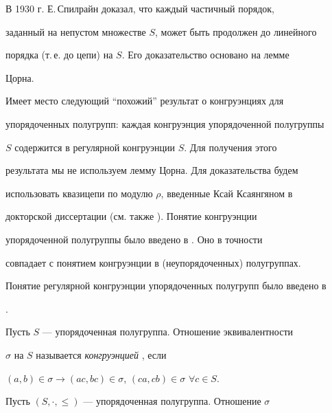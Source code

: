  




\maketitle 


\label{begin} 


 


В 1930 г. Е.\,Спилрайн \cite{1} доказал, что каждый частичный порядок, 


заданный на непустом множестве $S$, может быть продолжен до линейного 


порядка (т.\,е. до цепи) на $S$. Его доказательство основано на лемме 


Цорна. 


 


Имеет место следующий ``похожий'' результат о конгруэнциях для 


упорядоченных полугрупп: каждая конгруэнция упорядоченной полугруппы 


$S$ содержится в регулярной конгруэнции $S$. Для получения этого 


результата мы не используем лемму Цорна. Для доказательства будем 


использовать квазицепи по модулю $\rho$, введенные Ксай Ксаянгяном в 


докторской диссертации (см. также \cite{1a}). Понятие конгруэнции 


упорядоченной полугруппы было введено в \cite{2}. Оно в точности 


совпадает с понятием конгруэнции в (неупорядоченных) полугруппах. 


Понятие регулярной конгруэнции упорядоченных полугрупп было введено в 


\cite{3}. 


 


Пусть $S$ --- упорядоченная полугруппа. Отношение эквивалентности 


$\sigma$ на $S$ называется {\it конгруэнцией} \cite{4}, если 


$(a,b)\in\sigma\to(ac,bc)\in\sigma$, $(ca,cb)\in\sigma$ $\forall c\in 


S$. 


 


Пусть $(S,\cdot,\le)$ --- упорядоченная полугруппа. Отношение $\sigma$ 


